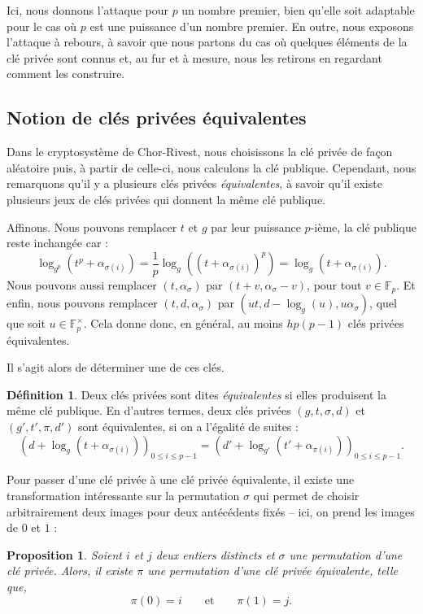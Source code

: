 \documentclass[a4paper, titlepage, 11pt]{article}
\newtheorem{prop}[theo]{Proposition}
\theoremstyle{definition}
\newtheorem{defi}[theo]{Définition}
\theoremstyle{remark}
\def\gf #1{\mathbb{F}_{#1}}
\begin{document}
Ici, nous donnons l'attaque pour $p$ un nombre premier, bien qu'elle soit adaptable pour le cas où $p$ est une puissance d'un nombre premier. En outre, nous exposons l'attaque à rebours, à savoir que nous partons du cas où quelques éléments de la clé privée sont connus et, au fur et à mesure, nous les retirons en regardant comment les construire.

\subsection{Notion de clés privées équivalentes}

Dans le cryptosystème de Chor-Rivest, nous choisissons la clé privée de façon aléatoire puis, à partir de celle-ci, nous calculons la clé publique. Cependant, nous remarquons qu'il y a plusieurs clés privées \textit{équivalentes}, à savoir qu'il existe plusieurs jeux de clés privées qui donnent la même clé publique.

Affinons. Nous pouvons remplacer $t$ et $g$ par leur puissance $p$-ième, la clé publique reste inchangée car :
$$\log_{g^p}\left(t^p + \alpha_{\sigma(i)}\right) = \frac{1}{p}\log_{g}\left(\left(t + \alpha_{\sigma(i)}\right)^p\right) = \log_{g}\left(t + \alpha_{\sigma(i)}\right).$$
Nous pouvons aussi remplacer $(t, \alpha_{\sigma})$ par $(t + v, \alpha_{\sigma} - v)$, pour tout $v \in \gf{p}$. Et enfin, nous pouvons remplacer $(t,d,\alpha_\sigma)$ par $(ut, d - \log_g(u), u\alpha_\sigma)$, quel que soit $u \in \gf{p}^\times$.
Cela donne donc, en général, au moins $hp(p-1)$ clés privées équivalentes.

Il s'agit alors de déterminer une de ces clés.

\begin{defi}
Deux clés privées sont dites \textit{équivalentes} si elles produisent la même clé publique. En d'autres termes, deux clés privées $(g,t,\sigma,d)$ et $(g',t',\pi ,d')$ sont équivalentes, si on a l'égalité de suites :
$$\left(d + \log_g(t + \alpha_{\sigma(i)})\right)_{0\leqslant i \leqslant p-1} = \left(d' + \log_{g'}(t' + \alpha_{\pi(i)})\right)_{0\leqslant i \leqslant p-1}.$$
\end{defi}

Pour passer d'une clé privée à une clé privée équivalente, il existe une transformation intéressante sur la permutation $\sigma$ qui permet de choisir arbitrairement deux images pour deux antécédents fixés -- ici, on prend les images de $0$ et $1$ :

\begin{prop}\label{prop:permutation}
Soient $i$ et $j$ deux entiers distincts et $\sigma$ une permutation d'une clé privée. Alors, il existe $\pi$ une permutation d'une clé privée équivalente, telle que, $$\pi(0) = i \qquad \text{et}\qquad \pi(1) = j.$$
\end{prop}
\end{document}
